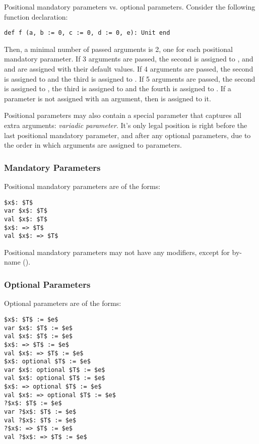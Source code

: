\example Positional mandatory parameters vs. optional parameters. Consider the following function declaration:
\begin{lstlisting}
def f (a, b := 0, c := 0, d := 0, e): Unit end
\end{lstlisting}

Then, a minimal number of passed arguments is 2, one for each positional mandatory parameter. If 3 arguments are passed, the second is assigned to , and  and  are assigned with their default values. If 4 arguments are passed, the second is assigned to  and the third is assigned to . If 5 arguments are passed, the second is assigned to , the third is assigned to  and the fourth is assigned to . If a parameter is not assigned with an argument, then  is assigned to it. 

Positional parameters may also contain a special parameter that captures all extra arguments: {\em variadic parameter}. It's only legal position is right before the last positional mandatory parameter, and after any optional parameters, due to the order in which arguments are assigned to parameters. 





\subsubsection{Mandatory Parameters}
\label{sec:mandatory-parameters}

Positional mandatory parameters are of the forms:
\begin{lstlisting}
$x$: $T$
var $x$: $T$
val $x$: $T$
$x$: => $T$
val $x$: => $T$
\end{lstlisting}

Positional mandatory parameters may not have any modifiers, except for  by-name (). 






\subsubsection{Optional Parameters}
\label{sec:optional-parameters}

Optional parameters are of the forms:
\begin{lstlisting}
$x$: $T$ := $e$
var $x$: $T$ := $e$
val $x$: $T$ := $e$
$x$: => $T$ := $e$
val $x$: => $T$ := $e$
$x$: optional $T$ := $e$
var $x$: optional $T$ := $e$
val $x$: optional $T$ := $e$
$x$: => optional $T$ := $e$
val $x$: => optional $T$ := $e$
?$x$: $T$ := $e$
var ?$x$: $T$ := $e$
val ?$x$: $T$ := $e$
?$x$: => $T$ := $e$
val ?$x$: => $T$ := $e$
\end{lstlisting}

